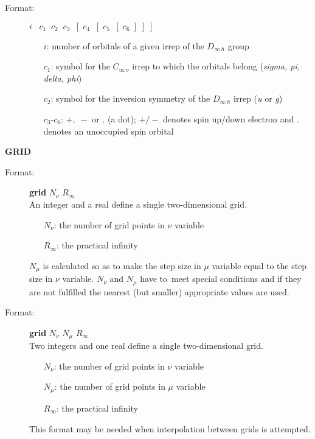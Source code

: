 \documentclass[12pt,a4paper]{article}
\begin{document}
\begin{description}
\begin{description}
\item[Format:] $i\;\;\;c_1\;\;c_2\;\;c_3\;\;[\;c_4\;\;[\;c_5\;\;[\;c_6\;]\;]\;]$
\begin{itemize}
\item[$i$:]  number of orbitals of a given irrep of the
$D_{\infty\,h}$ group
\item[$c_1$:] symbol for the $C_{\infty\,v}$ irrep to which the
orbitals belong ({\it sigma, pi, delta, phi})
\item[$c_2$:] symbol for the inversion symmetry of the $D_{\infty\,h}$
irrep ({\it u} or {\it g})
\item[$c_3$-$c_6$:] $+,\;-$ or . (a dot); $+/-$ denotes spin up/down
electron and . denotes an unoccupied spin orbital
\end{itemize}
\end{description}


\item \textbf{GRID}

\begin{description}
\item[Format:] \textbf{grid} $N_{\nu}$ $R_{\infty}$ \\
An integer and a real define a single two-dimensional grid.
\begin{itemize}
\item[$N_{\nu}$:] the number of grid points in $\nu$ variable
\item[$R_{\infty}$:] the practical infinity
\end{itemize}
$N_{\mu}$ is calculated so as to make the step size in $\mu$ variable equal to the
step size in $\nu$ variable. $N_{\nu}$ and $N_{\mu}$ have to~meet special conditions and if
they are not fulfilled the nearest (but smaller) appropriate values are used.
\end{description}

\begin{description}
\item[Format:] \textbf{grid} $N_{\nu}$ $N_{\mu}$ $R_{\infty}$ \\
Two integers and one real define a single two-dimensional grid.
\begin{itemize}
\item[$N_{\nu}$:] the number of grid points in $\nu$ variable
\item[$N_{\mu}$:] the number of grid points in $\mu$ variable
\item[$R_{\infty}$:] the practical infinity
\end{itemize}
This format may be needed when interpolation between grids is attempted.
\end{description}




\end{description}
\end{document}
